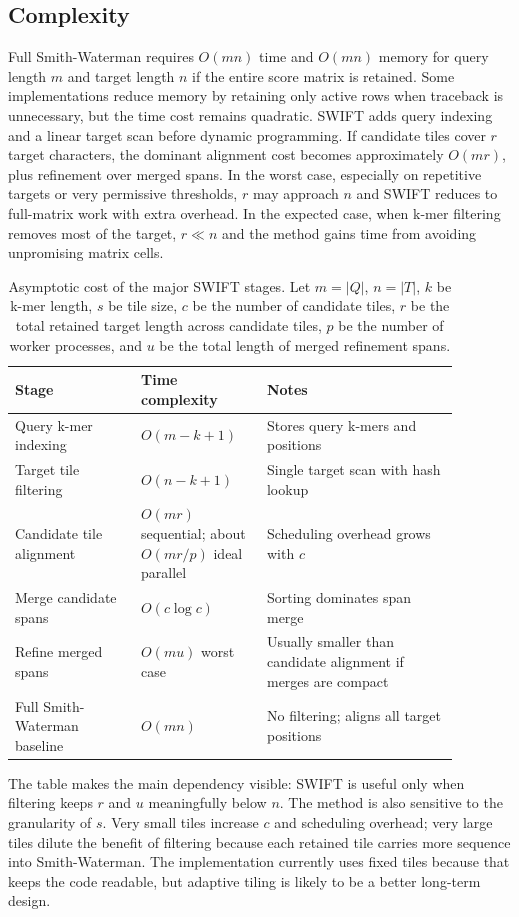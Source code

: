 \documentclass[11pt]{article}
\begin{document}
\subsection{Complexity}
Full Smith-Waterman requires $O(mn)$ time and $O(mn)$ memory for query length $m$ and target length $n$ if the entire score matrix is retained. Some implementations reduce memory by retaining only active rows when traceback is unnecessary, but the time cost remains quadratic. SWIFT adds query indexing and a linear target scan before dynamic programming. If candidate tiles cover $r$ target characters, the dominant alignment cost becomes approximately $O(mr)$, plus refinement over merged spans. In the worst case, especially on repetitive targets or very permissive thresholds, $r$ may approach $n$ and SWIFT reduces to full-matrix work with extra overhead. In the expected case, when k-mer filtering removes most of the target, $r \ll n$ and the method gains time from avoiding unpromising matrix cells.

\begin{table}[ht]
\centering
\caption{Asymptotic cost of the major SWIFT stages. Let $m=|Q|$, $n=|T|$, $k$ be k-mer length, $s$ be tile size, $c$ be the number of candidate tiles, $r$ be the total retained target length across candidate tiles, $p$ be the number of worker processes, and $u$ be the total length of merged refinement spans.}
\label{tab:complexity}
\begin{tabular}{p{0.25\linewidth}p{0.25\linewidth}p{0.38\linewidth}}
\toprule
Stage & Time complexity & Notes \\
\midrule
Query k-mer indexing & $O(m-k+1)$ & Stores query k-mers and positions \\
Target tile filtering & $O(n-k+1)$ & Single target scan with hash lookup \\
Candidate tile alignment & $O(mr)$ sequential; about $O(mr/p)$ ideal parallel & Scheduling overhead grows with $c$ \\
Merge candidate spans & $O(c\log c)$ & Sorting dominates span merge \\
Refine merged spans & $O(mu)$ worst case & Usually smaller than candidate alignment if merges are compact \\
Full Smith-Waterman baseline & $O(mn)$ & No filtering; aligns all target positions \\
\bottomrule
\end{tabular}
\end{table}

The table makes the main dependency visible: SWIFT is useful only when filtering keeps $r$ and $u$ meaningfully below $n$. The method is also sensitive to the granularity of $s$. Very small tiles increase $c$ and scheduling overhead; very large tiles dilute the benefit of filtering because each retained tile carries more sequence into Smith-Waterman. The implementation currently uses fixed tiles because that keeps the code readable, but adaptive tiling is likely to be a better long-term design.
\end{document}
